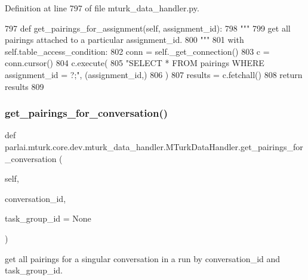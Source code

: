 Definition at line 797 of file mturk\+\_\+data\+\_\+handler.\+py.


\begin{DoxyCode}
797     \textcolor{keyword}{def }get\_pairings\_for\_assignment(self, assignment\_id):
798         \textcolor{stringliteral}{"""}
799 \textcolor{stringliteral}{        get all pairings attached to a particular assignment\_id.}
800 \textcolor{stringliteral}{        """}
801         with self.table\_access\_condition:
802             conn = self.\_get\_connection()
803             c = conn.cursor()
804             c.execute(
805                 \textcolor{stringliteral}{"SELECT * FROM pairings WHERE assignment\_id = ?;"}, (assignment\_id,)
806             )
807             results = c.fetchall()
808             \textcolor{keywordflow}{return} results
809 
\end{DoxyCode}
\mbox{\label{classparlai_1_1mturk_1_1core_1_1dev_1_1mturk__data__handler_1_1MTurkDataHandler_a507259114132bb247683c7f9b127c12c}} 
\subsubsection{\texorpdfstring{get\+\_\+pairings\+\_\+for\+\_\+conversation()}{get\_pairings\_for\_conversation()}}
{\footnotesize\ttfamily def parlai.\+mturk.\+core.\+dev.\+mturk\+\_\+data\+\_\+handler.\+M\+Turk\+Data\+Handler.\+get\+\_\+pairings\+\_\+for\+\_\+conversation (\begin{DoxyParamCaption}\item[{}]{self,  }\item[{}]{conversation\+\_\+id,  }\item[{}]{task\+\_\+group\+\_\+id = {\ttfamily None} }\end{DoxyParamCaption})}

\begin{DoxyVerb}get all pairings for a singular conversation in a run by conversation_id and
task_group_id.
\end{DoxyVerb}
 

